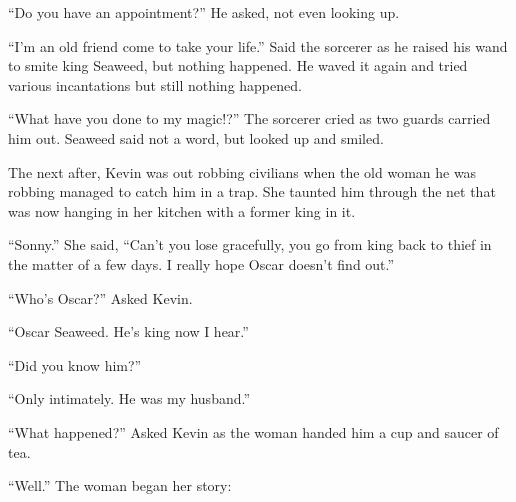``Do you have an appointment?'' He asked, not even looking up.

``I'm an old friend come to take your life.'' Said the sorcerer as he raised his wand to smite king Seaweed, but nothing happened. He waved it again and tried various incantations but still nothing happened.

``What have you done to my magic!?'' The sorcerer cried as two guards carried him out. Seaweed said not a word, but looked up and smiled.

\tbreak

The next after, Kevin was out robbing civilians when the old woman he was robbing managed to catch him in a trap. She taunted him through the net that was now hanging in her kitchen with a former king in it.

``Sonny.'' She said, ``Can't you lose gracefully, you go from king back to thief in the matter of a few days. I really hope Oscar doesn't find out.''

``Who's Oscar?'' Asked Kevin.

``Oscar Seaweed. He's king now I hear.''

``Did you know him?''

``Only intimately. He was my husband.''

``What happened?'' Asked Kevin as the woman handed him a cup and saucer of tea.

``Well.'' The woman began her story:

